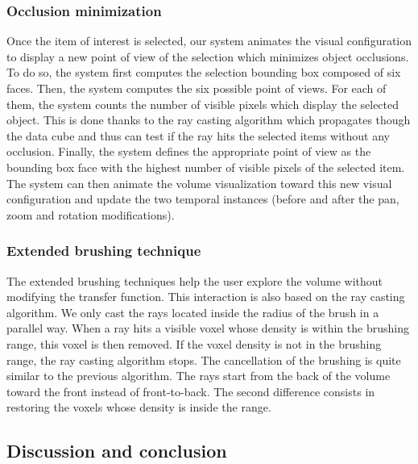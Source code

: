 \subsubsection{Occlusion minimization}

Once the item of interest is selected, our system animates the visual configuration to display a new point of view of the selection which minimizes object occlusions. To do so, the system first computes the selection bounding box composed of six faces. Then, the system computes the six possible point of views. For each of them, the system counts the number of visible pixels which display the selected object. This is done thanks to the ray casting algorithm which propagates though the data cube and thus can test if the ray hits the selected items without any occlusion. Finally, the system defines the appropriate point of view as the bounding box face with the highest number of visible pixels of the selected item.
The system can then animate the volume visualization toward this new visual configuration and update the two temporal instances (before and after the pan, zoom and rotation modifications).

\subsubsection{Extended brushing technique}

The extended brushing techniques help the user explore the volume without modifying the transfer function. This interaction is also based on the ray casting algorithm. We only cast the rays located inside the radius of the brush in a parallel way.
When a ray hits a visible voxel whose density is within the brushing range, this voxel is then removed. If the voxel density is not in the brushing range, the ray casting algorithm stops.
The cancellation of the brushing is quite similar to the previous algorithm. The rays start from the back of the volume toward the front instead of front-to-back. The second difference consists in restoring the voxels whose density is inside the range.

\subsection{Discussion and conclusion}

